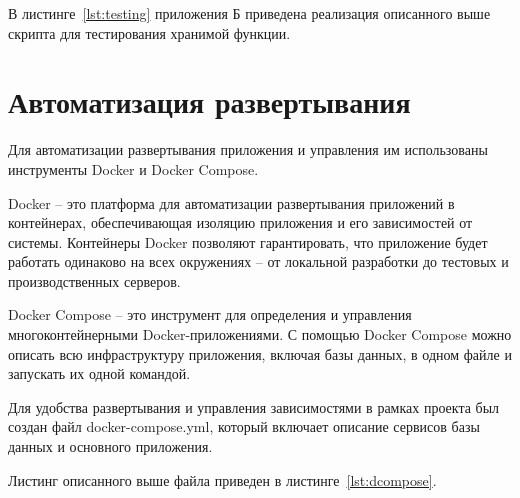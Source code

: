 В листинге~\ref{lst:testing} приложения Б приведена реализация описанного выше скрипта для тестирования хранимой функции.

\section{Автоматизация развертывания}

Для автоматизации развертывания приложения и управления им использованы инструменты Docker и Docker Compose.

Docker -- это платформа для автоматизации развертывания приложений в контейнерах, обеспечивающая изоляцию приложения и его зависимостей от системы. 
Контейнеры Docker позволяют гарантировать, что приложение будет работать одинаково на всех окружениях -- от локальной разработки до тестовых и производственных серверов.

Docker Compose -- это инструмент для определения и управления многоконтейнерными Docker-приложениями. 
С помощью Docker Compose можно описать всю инфраструктуру приложения, включая базы данных, в одном файле и запускать их одной командой.

Для удобства развертывания и управления зависимостями в рамках проекта был создан файл docker-compose.yml, который включает описание сервисов базы данных и основного приложения.

Листинг описанного выше файла приведен в листинге~\ref{lst:dcompose}.

